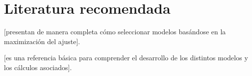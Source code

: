 
\section*{Literatura recomendada}


\cite{PosadaCrandall2001} [presentan de manera completa c\'omo seleccionar modelos bas\'andose en la maximizaci\'on del ajuste].

\cite{Swofford1996} [es una referencia b\'asica para comprender el desarrollo de los distintos modelos y los c\'alculos asociados].

